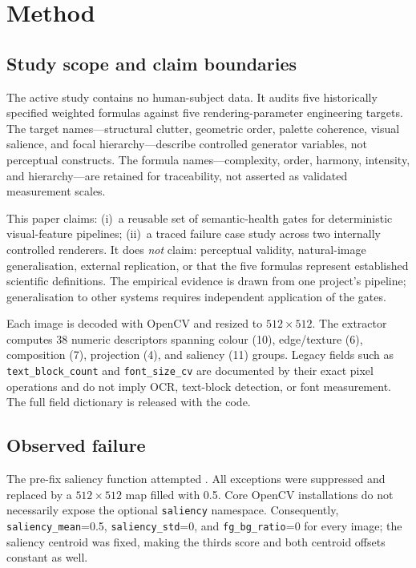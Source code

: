 \section{Method}
\label{sec:method}

\subsection{Study scope and claim boundaries}

The active study contains no human-subject data. It audits five historically specified weighted formulas against five rendering-parameter engineering targets. The target names---structural clutter, geometric order, palette coherence, visual salience, and focal hierarchy---describe controlled generator variables, not perceptual constructs. The formula names---complexity, order, harmony, intensity, and hierarchy---are retained for traceability, not asserted as validated measurement scales.

This paper claims: (i)~a reusable set of semantic-health gates for deterministic visual-feature pipelines; (ii)~a traced failure case study across two internally controlled renderers. It does \emph{not} claim: perceptual validity, natural-image generalisation, external replication, or that the five formulas represent established scientific definitions. The empirical evidence is drawn from one project's pipeline; generalisation to other systems requires independent application of the gates.

Each image is decoded with OpenCV and resized to $512\times512$. The extractor computes 38 numeric descriptors spanning colour (10), edge/texture (6), composition (7), projection (4), and saliency (11) groups. Legacy fields such as \texttt{text\_block\_count} and \texttt{font\_size\_cv} are documented by their exact pixel operations and do not imply OCR, text-block detection, or font measurement. The full field dictionary is released with the code.

\subsection{Observed failure}

The pre-fix saliency function attempted . All exceptions were suppressed and replaced by a $512\times512$ map filled with 0.5. Core OpenCV installations do not necessarily expose the optional \texttt{saliency} namespace. Consequently, \texttt{saliency\_mean}=0.5, \texttt{saliency\_std}=0, and \texttt{fg\_bg\_ratio}=0 for every image; the saliency centroid was fixed, making the thirds score and both centroid offsets constant as well.


